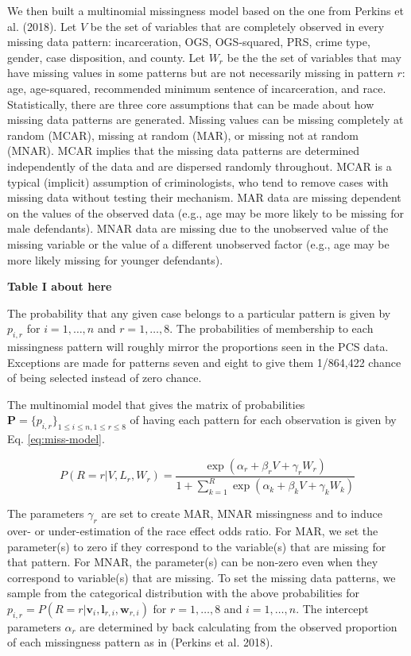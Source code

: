 \documentclass[titlepage]{article}
\begin{document}
We then built a multinomial missingness model based on the one from Perkins et al. (2018). Let \(V\) be the set of variables that are completely observed in every missing data pattern: incarceration, OGS, OGS-squared, PRS, crime type, gender, case disposition, and county. Let \(W_r\) be the the set of variables that may have missing values in some patterns but are not necessarily missing in pattern \(r\): age, age-squared, recommended minimum sentence of incarceration, and race. Statistically, there are three core assumptions that can be made about how missing data patterns are generated. Missing values can be missing completely at random (MCAR), missing at random (MAR), or missing not at random (MNAR). MCAR implies that the missing data patterns are determined independently of the data and are dispersed randomly throughout. MCAR is a typical (implicit) assumption of criminologists, who tend to remove cases with missing data without testing their mechanism. MAR data are missing dependent on the values of the observed data (e.g., age may be more likely to be missing for male defendants). MNAR data are missing due to the unobserved value of the missing variable or the value of a different unobserved factor (e.g., age may be more likely missing for younger defendants).

\begin{center}
    \textbf{Table I about here}
\end{center}

The probability that any given case belongs to a particular pattern is given by \(p_{i,r}\) for \(i = 1,\dots,n\) and \(r = 1,\dots,8\). The probabilities of membership to each missingness pattern will roughly mirror the proportions seen in the PCS data. Exceptions are made for patterns seven and eight to give them 1/864,422 chance of being selected instead of zero chance.

The multinomial model that gives the matrix of probabilities \(\mathbf{P} = \{p_{i,r}\}_{1 \leq i \leq n, 1 \leq r \leq 8}\) of having each pattern for each observation is given by Eq. \ref{eq:miss-model}.

\begin{equation} \label{eq:miss-model}
    P(R = r | V, L_r, W_r) = \frac{\exp(\alpha_r + \beta_r V + \gamma_r W_r)}{1 + \sum_{k = 1}^R\exp(\alpha_k + \beta_k V + \gamma_k W_k)}
\end{equation}

The parameters \(\gamma_r\) are set to create MAR, MNAR missingness and to induce over- or under-estimation of the race effect odds ratio. For MAR, we set the parameter(s) to zero if they correspond to the variable(s) that are missing for that pattern. For MNAR, the parameter(s) can be non-zero even when they correspond to variable(s) that are missing. To set the missing data patterns, we sample from the categorical distribution with the above probabilities for \(p_{i,r} = P(R = r | \mathbf{v}_i, \mathbf{l}_{r,i}, \mathbf{w}_{r,i})\) for \(r = 1,\dots, 8\) and \(i = 1,\dots, n\). The intercept parameters \(\alpha_r\) are determined by back calculating from the observed proportion of each missingness pattern as in (Perkins et al. 2018).
\end{document}

